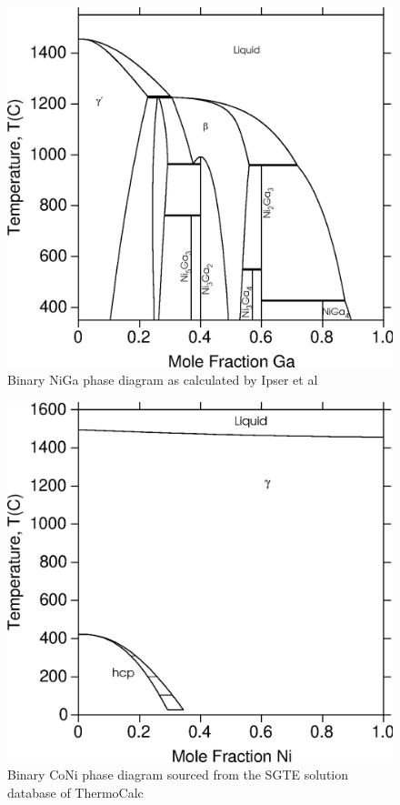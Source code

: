 \documentclass[article]{elsarticle}
\begin{document}
\begin{figure}[b!]
\centering
\includegraphics[scale=0.6]{NiGa_binary}
\caption{Binary NiGa phase diagram as calculated by Ipser et al \cite{Ipser04}}
\label{NiGa}
\end{figure}
\begin{figure}[t!]
\centering
\includegraphics[scale=0.6]{CoNi_binary}
\caption{Binary CoNi phase diagram sourced from the SGTE solution database of ThermoCalc}
\label{CoNi}
\end{figure}
\end{document}
